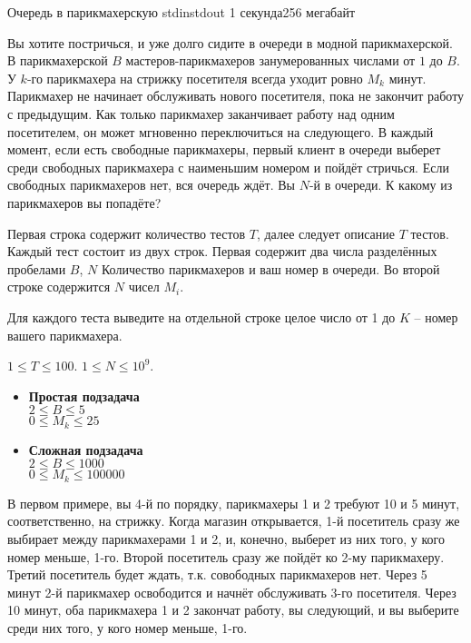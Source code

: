 
\begin{problem}{Очередь в парикмахерскую}
{stdin}{stdout}
{1 секунда}{256 мегабайт}{}

Вы хотите постричься, и уже долго сидите в очереди в модной парикмахерской.
В парикмахерской $B$ мастеров-парикмахеров занумерованных числами от $1$ до $B$. 
У $k$-го парикмахера на стрижку посетителя всегда уходит ровно $M_k$ минут.
Парикмахер не начинает обслуживать нового посетителя, пока не закончит работу с предыдущим.
Как только парикмахер заканчивает работу над одним посетителем, он может мгновенно переключиться на следующего.
В каждый момент, если есть свободные парикмахеры, первый клиент в очереди выберет среди свободных парикмахера с наименьшим номером и пойдёт стричься.
Если свободных парикмахеров нет, вся очередь ждёт.
Вы $N$-й в очереди. К какому из парикмахеров вы попадёте?

\InputFile

Первая строка содержит количество тестов $T$, далее следует описание $T$ тестов.
Каждый тест состоит из двух строк. Первая содержит два числа разделённых пробелами $B$, $N$
Количество парикмахеров и ваш номер в очереди. 
Во второй строке содержится $N$ чисел $M_i$.

\OutputFile

Для каждого теста выведите на отдельной строке целое число от 1 до $K$ -- номер вашего парикмахера.

\Scoring

$1 \le T \le 100$.
$1 \le N \le 10^9$.

\begin{itemize}
  \item {\bf Простая подзадача} \\
	$2 \le B \le 5$ \\
	$0 \le M_k \le 25$
  \item {\bf Сложная подзадача} \\
	$2 \le B \le 1000$ \\
	$0 \le M_k \le 100000$
\end{itemize}

\Examples

\begin{example}
%
\end{example}

\Note

В первом примере, вы 4-й по порядку, парикмахеры 1 и 2 требуют 10 и 5 минут, соответственно, на стрижку. 
Когда магазин открывается, 1-й посетитель сразу же выбирает между парикмахерами 1 и 2, и, конечно, выберет из них того, у кого номер меньше, 1-го.
Второй посетитель сразу же пойдёт ко 2-му парикмахеру. 
Третий посетитель будет ждать, т.к. совободных парикмахеров нет.
Через 5 минут 2-й парикмахер освободится и начнёт обслуживать 3-го посетителя.
Через 10 минут, оба парикмахера 1 и 2 закончат работу, вы следующий, и вы выберите среди них того, у кого номер меньше, 1-го.

\end{problem}
